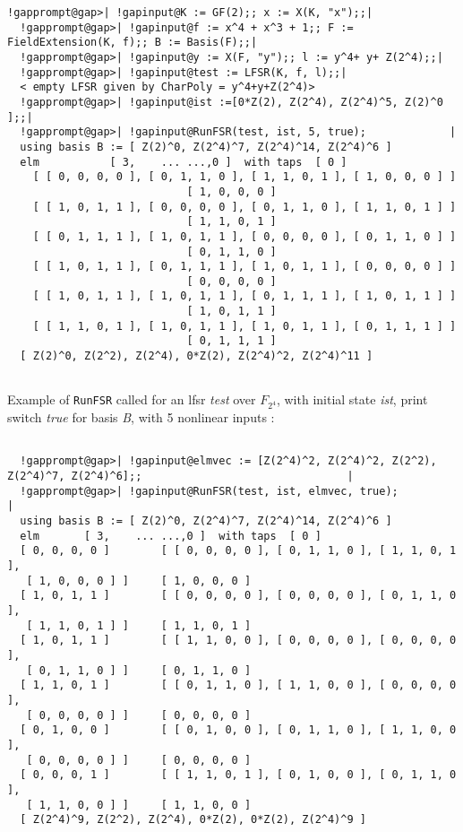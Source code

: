 \documentclass[a4paper,11pt]{report}
\begin{document}
{{{\begin{Verbatim}[commandchars=!@|,fontsize=\small,frame=single,label=Example]
  !gapprompt@gap>| !gapinput@K := GF(2);; x := X(K, "x");;|
  !gapprompt@gap>| !gapinput@f := x^4 + x^3 + 1;; F := FieldExtension(K, f);; B := Basis(F);;|
  !gapprompt@gap>| !gapinput@y := X(F, "y");; l := y^4+ y+ Z(2^4);;|
  !gapprompt@gap>| !gapinput@test := LFSR(K, f, l);;|
  < empty LFSR given by CharPoly = y^4+y+Z(2^4)>
  !gapprompt@gap>| !gapinput@ist :=[0*Z(2), Z(2^4), Z(2^4)^5, Z(2)^0 ];;|
  !gapprompt@gap>| !gapinput@RunFSR(test, ist, 5, true);             |
  using basis B := [ Z(2)^0, Z(2^4)^7, Z(2^4)^14, Z(2^4)^6 ]	
  elm			[ 3,	...	...,0 ]  with taps  [ 0 ]
    [ [ 0, 0, 0, 0 ], [ 0, 1, 1, 0 ], [ 1, 1, 0, 1 ], [ 1, 0, 0, 0 ] ]
  							[ 1, 0, 0, 0 ]
  	[ [ 1, 0, 1, 1 ], [ 0, 0, 0, 0 ], [ 0, 1, 1, 0 ], [ 1, 1, 0, 1 ] ]
  							[ 1, 1, 0, 1 ]
  	[ [ 0, 1, 1, 1 ], [ 1, 0, 1, 1 ], [ 0, 0, 0, 0 ], [ 0, 1, 1, 0 ] ]
  							[ 0, 1, 1, 0 ]
  	[ [ 1, 0, 1, 1 ], [ 0, 1, 1, 1 ], [ 1, 0, 1, 1 ], [ 0, 0, 0, 0 ] ]
  							[ 0, 0, 0, 0 ]
  	[ [ 1, 0, 1, 1 ], [ 1, 0, 1, 1 ], [ 0, 1, 1, 1 ], [ 1, 0, 1, 1 ] ]
  							[ 1, 0, 1, 1 ]
  	[ [ 1, 1, 0, 1 ], [ 1, 0, 1, 1 ], [ 1, 0, 1, 1 ], [ 0, 1, 1, 1 ] ]
  							[ 0, 1, 1, 1 ]
  [ Z(2)^0, Z(2^2), Z(2^4), 0*Z(2), Z(2^4)^2, Z(2^4)^11 ]
  
\end{Verbatim}
 Example of \texttt{RunFSR} called for an lfsr \emph{test} over $F_{2^4}$, with initial state \emph{ist}, print switch \emph{true} for basis \emph{B}, with 5 nonlinear inputs : 
\begin{Verbatim}[commandchars=!@|,fontsize=\small,frame=single,label=Example]
  
  !gapprompt@gap>| !gapinput@elmvec := [Z(2^4)^2, Z(2^4)^2, Z(2^2), Z(2^4)^7, Z(2^4)^6];;                                |
  !gapprompt@gap>| !gapinput@RunFSR(test, ist, elmvec, true);                         |
  using basis B := [ Z(2)^0, Z(2^4)^7, Z(2^4)^14, Z(2^4)^6 ]	
  elm		[ 3,	...	...,0 ]  with taps  [ 0 ]
  [ 0, 0, 0, 0 ]		[ [ 0, 0, 0, 0 ], [ 0, 1, 1, 0 ], [ 1, 1, 0, 1 ],
   [ 1, 0, 0, 0 ] ]		[ 1, 0, 0, 0 ]
  [ 1, 0, 1, 1 ]		[ [ 0, 0, 0, 0 ], [ 0, 0, 0, 0 ], [ 0, 1, 1, 0 ],
   [ 1, 1, 0, 1 ] ]		[ 1, 1, 0, 1 ]
  [ 1, 0, 1, 1 ]		[ [ 1, 1, 0, 0 ], [ 0, 0, 0, 0 ], [ 0, 0, 0, 0 ],
   [ 0, 1, 1, 0 ] ]		[ 0, 1, 1, 0 ]
  [ 1, 1, 0, 1 ]		[ [ 0, 1, 1, 0 ], [ 1, 1, 0, 0 ], [ 0, 0, 0, 0 ],
   [ 0, 0, 0, 0 ] ]		[ 0, 0, 0, 0 ]
  [ 0, 1, 0, 0 ]		[ [ 0, 1, 0, 0 ], [ 0, 1, 1, 0 ], [ 1, 1, 0, 0 ],
   [ 0, 0, 0, 0 ] ]		[ 0, 0, 0, 0 ]
  [ 0, 0, 0, 1 ]		[ [ 1, 1, 0, 1 ], [ 0, 1, 0, 0 ], [ 0, 1, 1, 0 ],
   [ 1, 1, 0, 0 ] ]		[ 1, 1, 0, 0 ]
  [ Z(2^4)^9, Z(2^2), Z(2^4), 0*Z(2), 0*Z(2), Z(2^4)^9 ]
  

\end{Verbatim}}}}
\end{document}
